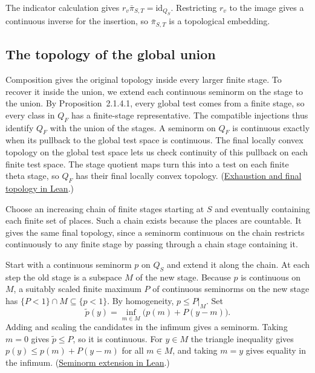 The indicator calculation gives \(r_v\bar\pi_{S,T}=\mathrm{id}_{Q_S}\).
Restricting \(r_v\) to the image gives a continuous inverse for the
insertion, so \(\bar\pi_{S,T}\) is a topological embedding.

\subsection{The topology of the global union}

Composition gives the original topology inside every larger finite stage.
To recover it inside the union, we extend each continuous seminorm on the
stage to the union. By Proposition~2.1.4.1, every global test comes from a
finite stage, so every class in \(Q_F\) has a finite-stage representative.
The compatible injections thus identify \(Q_F\) with the union of the stages. A seminorm on \(Q_F\) is continuous exactly when its pullback
to the global test space is continuous. The final locally convex topology
on the global test space lets us check continuity of this pullback on each
finite test space. The stage quotient maps turn this into a test on each
finite theta stage, so \(Q_F\) has their final locally convex topology.
(\href{https://github.com/mccorvie/riemann-masullo/blob/ac7e1cde68ff1fac01ecbef3c0e9f48e46bc1f06/RiemannMasullo/Ch05_ThetaZSpaces/Sec2.lean#L2458-L2499}{Exhaustion and final topology in Lean}.)

Choose an increasing chain of finite stages starting at \(S\) and eventually
containing each finite set of places. Such a chain exists because the places
are countable. It gives the same final topology, since a seminorm continuous
on the chain restricts continuously to any finite stage by passing through a
chain stage containing it.

Start with a continuous seminorm \(p\) on \(Q_S\) and extend it along the
chain. At each step the old stage is a subspace \(M\) of the new stage.
Because \(p\) is continuous on \(M\), a suitably scaled finite maximum
\(P\) of continuous seminorms on the new stage has
\(\{P<1\}\cap M\subseteq\{p<1\}\). By homogeneity, \(p\leq P|_M\). Set
\[
  \widetilde p(y)=\inf_{m\in M}\bigl(p(m)+P(y-m)\bigr).
\]
Adding and scaling the candidates in the infimum gives a seminorm. Taking
\(m=0\) gives \(\widetilde p\leq P\), so it is continuous. For \(y\in M\) the triangle
inequality gives \(p(y)\leq p(m)+P(y-m)\) for all \(m\in M\), and taking
\(m=y\) gives equality in the infimum.
(\href{https://github.com/mccorvie/riemann-masullo/blob/ac7e1cde68ff1fac01ecbef3c0e9f48e46bc1f06/RiemannMasullo/ForMathlib/Analysis/LocallyConvex/WithSeminorms.lean#L19-L46}{Seminorm extension in Lean}.)

